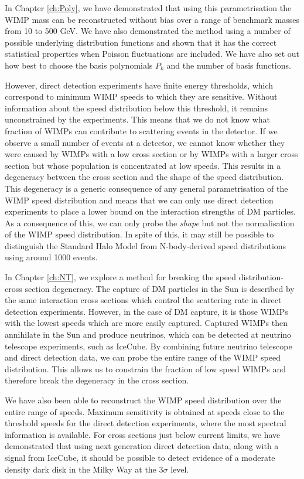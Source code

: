In Chapter \ref{ch:Poly}, we have demonstrated that using this parametrisation the WIMP mass can be reconstructed without bias over a range of benchmark masses from 10 to 500 GeV. We have also demonstrated the method using a number of possible underlying distribution functions and shown that it has the correct statistical properties when Poisson fluctuations are included. We have also set out how best to choose the basis polynomials $P_k$ and the number of basis functions.

However, direct detection experiments have finite energy thresholds, which correspond to minimum WIMP speeds to which they are sensitive. Without information about the speed distribution below this threshold, it remains unconstrained by the experiments. This means that we do not know what fraction of WIMPs can contribute to scattering events in the detector. If we observe a small number of events at a detector, we cannot know whether they were caused by WIMPs with a low cross section or by WIMPs with a larger cross section but whose population is concentrated at low speeds. This results in a degeneracy between the cross section and the shape of the speed distribution. This degeneracy is a generic consequence of any general parametrisation of the WIMP speed distribution and means that we can only use direct detection experiments to place a lower bound on the interaction strengths of DM particles. As a consequence of this, we can only probe the \textit{shape} but not the normalisation of the WIMP speed distribution. In spite of this, it may still be possible to distinguish the Standard Halo Model from N-body-derived speed distributions using around 1000 events.

In Chapter \ref{ch:NT}, we explore a method for breaking the speed distribution-cross section degeneracy. The capture of DM particles in the Sun is described by the same interaction cross sections which control the scattering rate in direct detection experiments. However, in the case of DM capture, it is those WIMPs with the lowest speeds which are more easily captured. Captured WIMPs then annihilate in the Sun and produce neutrinos, which can be detected at neutrino telescope experiments, such as IceCube. By combining future neutrino telescope and direct detection data, we can probe the entire range of the WIMP speed distribution. This allows us to constrain the fraction of low speed WIMPs and therefore break the degeneracy in the cross section.

We have also been able to reconstruct the WIMP speed distribution over the entire range of speeds. Maximum sensitivity is obtained at speeds close to the threshold speeds for the direct detection experiments, where the most spectral information is available. For cross sections just below current limits, we have demonstrated that using next generation direct detection data, along with a signal from IceCube, it should be possible to detect evidence of a moderate density dark disk in the Milky Way at the $3\sigma$ level.


